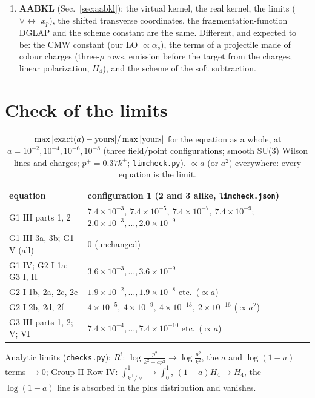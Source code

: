 \documentclass[10pt]{article}
\numberwithin{equation}{section}
\newcommand{\LO}{{\rm LO}}
\begin{document}
\begin{enumerate}
\begin{itemize}
\item Group III: with $\zeta=\frac{k^+}{p^++k^+}$ the measures are $\frac{d\zeta}{\zeta}$, $\big[\frac{1}{1-\zeta}\big]_+d\zeta$, $\frac{d\zeta}{\zeta^2}$ and the phase is $e^{-i\frac{k}{\zeta}\cdot(y'-\zeta w-(1-\zeta)z)}$; one line in closed form;
\item Group I Row II part 1 $+$ c.c.\ $=\frac{\alpha_sN_c}{2\pi}\big(\frac{67}{9}-\frac{\pi^2}{3}\big)\LO=\frac{\alpha_s}{2\pi}2K\,\LO$ ($K$: the CMW constant).
\end{itemize}
Final result: Eq.~\eqref{eq:final}.
\item \textbf{AABKL} (Sec.~\ref{sec:aabkl}): the virtual kernel, the real kernel, the limits ($\vee\leftrightarrow$ $x_p$), the shifted transverse coordinates, the fragmentation-function DGLAP and the scheme constant are the same. Different, and expected to be: the CMW constant (our LO $\propto\alpha_s$), the terms of a projectile made of colour charges (three-$\rho$ rows, emission before the target from the charges, linear polarization, $H_4$), and the scheme of the soft subtraction.
\end{enumerate}

\section{Check of the limits}\label{sec:check}
\begin{table}[h]\centering\small
\caption{$\max|{\rm exact}(a)-{\rm yours}|/\max|{\rm yours}|$ for the equation as a whole, at $a=10^{-2},10^{-4},10^{-6},10^{-8}$ (three field/point configurations; smooth SU(3) Wilson lines and charges; $p^+=0.37k^+$; \texttt{limcheck.py}). $\propto a$ (or $a^2$) everywhere: every equation is the limit.}\label{tab:lim}
\begin{tabular}{@{}ll@{}}\toprule
equation & configuration 1 \quad (2 and 3 alike, \texttt{limcheck.json})\\\midrule
G1 III parts 1, 2 & $7.4\!\times\!10^{-3},\ 7.4\!\times\!10^{-5},\ 7.4\!\times\!10^{-7},\ 7.4\!\times\!10^{-9}$;\quad $2.0\!\times\!10^{-3},\dots,2.0\!\times\!10^{-9}$\\
G1 III 3a, 3b; G1 V (all) & $0$ (unchanged)\\
G1 IV; G2 I 1a; G3 I, II & $3.6\!\times\!10^{-3},\dots,3.6\!\times\!10^{-9}$\\
G2 I 1b, 2a, 2c, 2e & $1.9\!\times\!10^{-2},\dots,1.9\!\times\!10^{-8}$ etc.\ ($\propto a$)\\
G2 I 2b, 2d, 2f & $4\!\times\!10^{-5},\ 4\!\times\!10^{-9},\ 4\!\times\!10^{-13},\ 2\!\times\!10^{-16}$ ($\propto a^2$)\\
G3 III parts 1, 2; V; VI & $7.4\!\times\!10^{-4},\dots,7.4\!\times\!10^{-10}$ etc.\ ($\propto a$)\\\bottomrule
\end{tabular}
\end{table}
Analytic limits (\texttt{checks.py}): $R^i$: $\log\frac{p^2}{k^2+ap^2}\to\log\frac{p^2}{k^2}$, the $a$ and $\log(1-a)$ terms $\to0$; Group II Row IV: $\int_{k^+/\vee}^1\to\int_0^1$, $(1-a)H_4\to H_4$, the $\log(1-a)$ line is absorbed in the plus distribution and vanishes.
\end{document}
